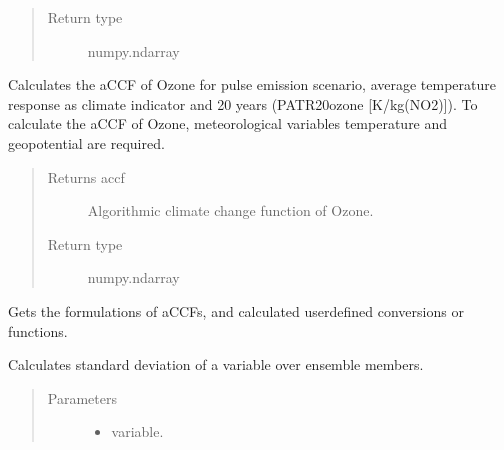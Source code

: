 \documentclass[a4paper,11pt,english]{sphinxmanual}
\begin{document}
\begin{fulllineitems}
\begin{fulllineitems}
\begin{quote}
\begin{description}
\item[{Return type}] \leavevmode
numpy.ndarray

\end{description}\end{quote}

\end{fulllineitems}


\begin{fulllineitems}
\label{\detokenize{envlib:envlib.accf.CalAccf.accf_o3}}
Calculates the aCCF of Ozone for pulse emission scenario, average temperature response as climate
indicator and 20 years (P\sphinxhyphen{}ATR20\sphinxhyphen{}ozone {[}K/kg(NO2){]}). To calculate the aCCF of Ozone, meteorological variables
temperature and geopotential are required.
\begin{quote}\begin{description}
\item[{Returns accf}] \leavevmode
Algorithmic climate change function of Ozone.

\item[{Return type}] \leavevmode
numpy.ndarray

\end{description}\end{quote}

\end{fulllineitems}


\begin{fulllineitems}
\label{\detokenize{envlib:envlib.accf.CalAccf.get_accfs}}
Gets the formulations of aCCFs, and calculated user\sphinxhyphen{}defined conversions or functions.

\end{fulllineitems}


\begin{fulllineitems}
\label{\detokenize{envlib:envlib.accf.CalAccf.get_std}}
Calculates standard deviation of a variable over ensemble members.
\begin{quote}\begin{description}
\item[{Parameters}] \leavevmode\begin{itemize}
\item {} 
 \textendash{} variable.


\end{itemize}
\end{description}
\end{quote}
\end{fulllineitems}
\end{fulllineitems}
\end{document}
